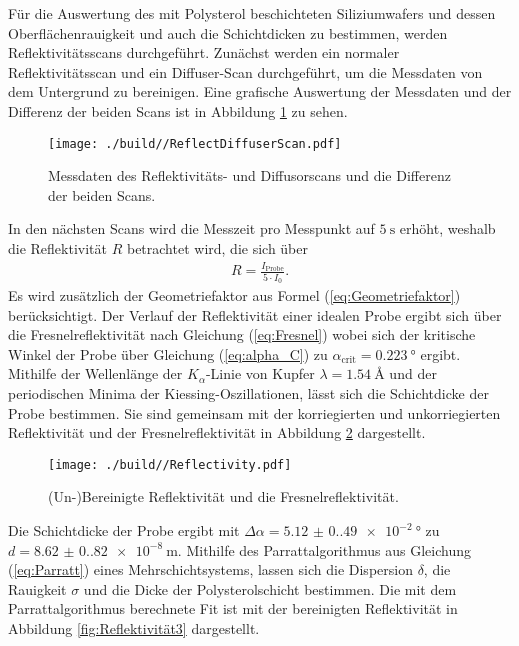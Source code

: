 Für die Auswertung des mit Polysterol beschichteten Siliziumwafers und dessen Oberflächenrauigkeit und auch die Schichtdicken zu bestimmen, werden Reflektivitätsscans durchgeführt.
Zunächst werden ein normaler Reflektivitätsscan und ein Diffuser-Scan durchgeführt, um die Messdaten von dem Untergrund zu bereinigen.
Eine grafische Auswertung der Messdaten und der Differenz der beiden Scans ist in Abbildung \ref{fig:Reflektivität} zu sehen.
\begin{figure}[H]
    \centering
    \texttt{[image: ./build//ReflectDiffuserScan.pdf]}
    \caption{Messdaten des Reflektivitäts- und Diffusorscans und die Differenz der beiden Scans.}
    \label{fig:Reflektivität}
\end{figure}
\noindent
In den nächsten Scans wird die Messzeit pro Messpunkt auf $\SI{5}{\second}$ erhöht, weshalb die Reflektivität $R$ betrachtet wird, die sich über
\begin{align*}
    R = \frac{I_{\text{Probe}}}{5\cdot I_{0}}.
\end{align*}
Es wird zusätzlich der Geometriefaktor aus Formel (\ref{eq:Geometriefaktor}) berücksichtigt.
Der Verlauf der Reflektivität einer idealen Probe ergibt sich über die Fresnelreflektivität nach Gleichung (\ref{eq:Fresnel}) %
wobei sich der kritische Winkel der Probe über Gleichung (\ref{eq:alpha_C}) zu $\alpha_{\text{crit}} = \SI{0.223}{\degree}$ ergibt.
Mithilfe der Wellenlänge der $K_{\alpha}$-Linie von Kupfer $\lambda = \SI{1.54}{\angstrom}$ und der periodischen Minima der Kiessing-Oszillationen, lässt sich die Schichtdicke der Probe bestimmen.
Sie sind gemeinsam mit der korriegierten und unkorriegierten Reflektivität und der Fresnelreflektivität in Abbildung \ref{fig:Reflektivität2} dargestellt.
\begin{figure}[H]
    \centering
    \texttt{[image: ./build//Reflectivity.pdf]}
    \caption{(Un-)Bereinigte Reflektivität und die Fresnelreflektivität.}
    \label{fig:Reflektivität2}
\end{figure}
\noindent
Die Schichtdicke der Probe ergibt mit $\Delta\alpha= \SI{5.12(0.49)e-2}{\degree}$ zu $d = \SI{8.62(0.82)e-8}{\meter}$. \newline
Mithilfe des Parrattalgorithmus aus Gleichung (\ref{eq:Parratt}) eines Mehrschichtsystems, lassen sich die Dispersion $\delta$, die Rauigkeit $\sigma$ und die Dicke der Polysterolschicht bestimmen.
Die mit dem Parrattalgorithmus berechnete Fit ist mit der bereinigten Reflektivität in Abbildung \ref{fig:Reflektivität3} dargestellt.
